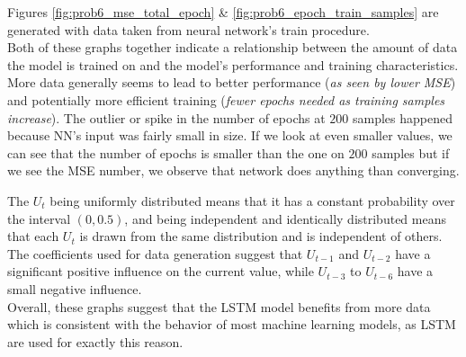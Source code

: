 Figures \ref{fig:prob6_mse_total_epoch} \& \ref{fig:prob6_epoch_train_samples} are generated with data taken from neural network's train procedure.\\

Both of these graphs together indicate a relationship between the amount of data the model is trained on and the model's performance and training characteristics. More data generally seems to lead to better performance (\textit{as seen by lower MSE}) and potentially more efficient training (\textit{fewer epochs needed as training samples increase}). The outlier or spike in the number of epochs at $200$ samples happened because NN's input was fairly small in size. 
If we look at even smaller values, we can see that the number of epochs is smaller than the one on $200$ samples but if we see the MSE number, we observe that network does anything than converging.

The $U_t$ being uniformly distributed means that it has a constant probability over the interval $(0, 0.5)$, and being independent and identically distributed means that each $U_t$ is drawn from the same distribution and is independent of others. The coefficients used for data generation suggest that $U_{t-1}$ and $U_{t-2}$ have a significant positive influence on the current value, while $U_{t-3}$ to $U_{t-6}$ have a small negative influence.\\

Overall, these graphs suggest that the LSTM model benefits from more data which is consistent with the behavior of most machine learning models, as LSTM are used for exactly this reason. 
\vspace{3mm}
